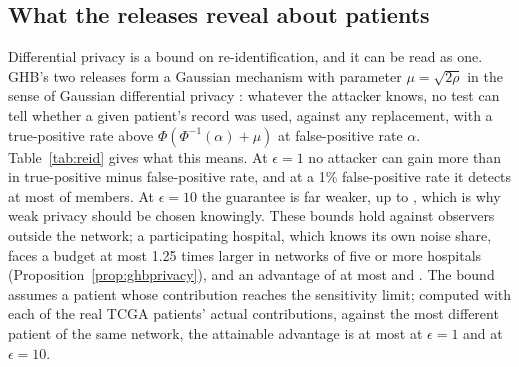 \begin{table}[t]
\caption{Images: balanced accuracy (higher is better), mean over hospitals and repetitions. ISIC 2019: the data on which the image version was designed (six centers, eight classes, \SimIsicImgReps{} repetitions). Camelyon17: held-out evaluation (five hospitals, binary, 200 training patches each, \SimCamReps{} repetitions). Every method uses the same frozen encoder, public projection and logit adjustment. Literature methods use the configurations frozen on the development networks of Section~\ref{sec:real-tcga}. Bold: the best per column among methods that use other hospitals, oracle excluded. $\dagger$: not private. $\star$: the best of the six methods on each test set, which no hospital can do.}
\label{tab:images}
\end{table}

\subsection{What the releases reveal about patients}\label{sec:real-reid}

Differential privacy is a bound on re-identification, and it can be read as one. GHB's two releases form a Gaussian mechanism with parameter $\mu=\sqrt{2\rho}$ in the sense of Gaussian differential privacy \cite{dong2022gaussian}: whatever the attacker knows, no test can tell whether a given patient's record was used, against any replacement, with a true-positive rate above $\Phi(\Phi^{-1}(\alpha)+\mu)$ at false-positive rate $\alpha$. Table~\ref{tab:reid} gives what this means. At $\epsilon=1$ no attacker can gain more than \SimReidOneAdv{} in true-positive minus false-positive rate, and at a 1\% false-positive rate it detects at most \SimReidOneTprOne{} of members. At $\epsilon=10$ the guarantee is far weaker, up to \SimReidTenAdv, which is why weak privacy should be chosen knowingly. These bounds hold against observers outside the network; a participating hospital, which knows its own noise share, faces a budget at most 1.25 times larger in networks of five or more hospitals (Proposition~\ref{prop:ghbprivacy}), and an advantage of at most \SimReidOneAdvHosp{} and \SimReidTenAdvHosp. The bound assumes a patient whose contribution reaches the sensitivity limit; computed with each of the \SimReidPatients{} real TCGA patients' actual contributions, against the most different patient of the same network, the attainable advantage is at most \SimReidOneRealMax{} at $\epsilon=1$ and \SimReidTenRealMax{} at $\epsilon=10$.

